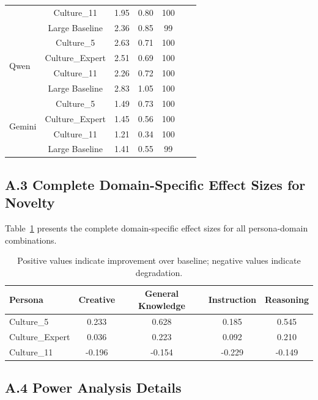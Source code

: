 \documentclass{article}
\begin{document}
\begin{table}[H]
\begin{tabular}{lcccccc}
 & Culture\_11 & 1.95 & 0.80 & 100 \\
 & Large Baseline & 2.36 & 0.85 & 99 \\
\midrule
\multirow{4}{*}{Qwen} & Culture\_5 & 2.63 & 0.71 & 100 \\
 & Culture\_Expert & 2.51 & 0.69 & 100 \\
 & Culture\_11 & 2.26 & 0.72 & 100 \\
 & Large Baseline & 2.83 & 1.05 & 100 \\
\midrule
\multirow{4}{*}{Gemini} & Culture\_5 & 1.49 & 0.73 & 100 \\
 & Culture\_Expert & 1.45 & 0.56 & 100 \\
 & Culture\_11 & 1.21 & 0.34 & 100 \\
 & Large Baseline & 1.41 & 0.55 & 99 \\
\bottomrule
\end{tabular}
\end{table}

\newpage
\subsection*{A.3 Complete Domain-Specific Effect Sizes for Novelty}

Table~\ref{tab:domain_novelty_full} presents the complete domain-specific effect sizes for all persona-domain combinations.

\begin{table}[H]
\centering
\caption{Complete Domain-Specific Effect Sizes for Novelty}
\label{tab:domain_novelty_full}
\begin{tabular}{lcccc}
\toprule
\textbf{Persona} & \textbf{Creative} & \textbf{General Knowledge} & \textbf{Instruction} & \textbf{Reasoning} \\
\midrule
Culture\_5 & 0.233 & 0.628 & 0.185 & 0.545 \\
Culture\_Expert & 0.036 & 0.223 & 0.092 & 0.210 \\
Culture\_11 & -0.196 & -0.154 & -0.229 & -0.149 \\
\bottomrule
\end{tabular}
\caption*{\footnotesize Positive values indicate improvement over baseline; negative values indicate degradation.}
\end{table}

\newpage
\subsection*{A.4 Power Analysis Details}
\end{document}
